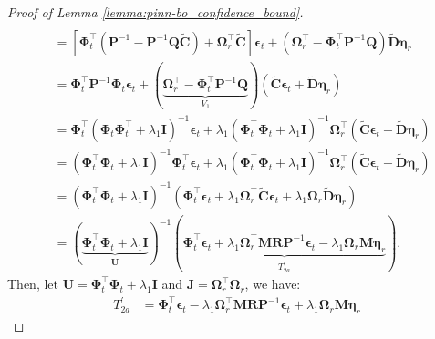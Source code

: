 \begin{proof}[Proof of Lemma \ref{lemma:pinn-bo_confidence_bound}]
\begin{align*}
\\
       & = \left[\boldsymbol{\Phi}_t^\top (\mathbf{P}^{-1} - \mathbf{P}^{-1}\mathbf{Q}\widetilde{\mathbf{C}}) +  \boldsymbol{\Omega}_r^\top \widetilde{\mathbf{C}}\right]\boldsymbol{\epsilon}_t + (\boldsymbol{\Omega}_r^\top - \boldsymbol{\Phi}_t^\top\mathbf{P}^{-1}\mathbf{Q})\widetilde{\mathbf{D}} \boldsymbol{\eta}_r 
\\ 
       & = \boldsymbol{\Phi}_t^\top \mathbf{P}^{-1} \boldsymbol{\Phi}_t \boldsymbol{\epsilon}_t + (\underbrace{\boldsymbol{\Omega}_r^\top - \boldsymbol{\Phi}_t^\top\mathbf{P}^{-1}\mathbf{Q}}_{V_1})(\widetilde{\mathbf{C}} \boldsymbol{\epsilon}_t + \widetilde{\mathbf{D}} \boldsymbol{\eta}_r) 
\\
       & = \boldsymbol{\Phi}_t^\top (\boldsymbol{\Phi}_t\boldsymbol{\Phi}_t^\top + \lambda_1\mathbf{I})^{-1} \boldsymbol{\epsilon}_t + \lambda_1(\boldsymbol{\Phi}_t^\top\boldsymbol{\Phi}_t + \lambda_1\mathbf{I})^{-1} \boldsymbol{\Omega}_r^\top (\widetilde{\mathbf{C}} \boldsymbol{\epsilon}_t + \widetilde{\mathbf{D}} \boldsymbol{\eta}_r) 
\\
       & = (\boldsymbol{\Phi}_t^\top\boldsymbol{\Phi}_t + \lambda_1\mathbf{I})^{-1} \boldsymbol{\Phi}_t^\top \boldsymbol{\epsilon}_t + \lambda_1(\boldsymbol{\Phi}_t^\top\boldsymbol{\Phi}_t + \lambda_1\mathbf{I})^{-1} \boldsymbol{\Omega}_r^\top (\widetilde{\mathbf{C}} \boldsymbol{\epsilon}_t + \widetilde{\mathbf{D}} \boldsymbol{\eta}_r) 
\\
       & = (\boldsymbol{\Phi}_t^\top\boldsymbol{\Phi}_t + \lambda_1\mathbf{I})^{-1} (\boldsymbol{\Phi}_t^\top \boldsymbol{\epsilon}_t + \lambda_1\boldsymbol{\Omega}_r^\top \widetilde{\mathbf{C}} \boldsymbol{\epsilon}_t +  \lambda_1\boldsymbol{\Omega}_r\widetilde{\mathbf{D}} \boldsymbol{\eta}_r) 
\\
       & = (\underbrace{\boldsymbol{\Phi}_t^\top\boldsymbol{\Phi}_t + \lambda_1\mathbf{I}}_\mathbf{U})^{-1} (\underbrace{\boldsymbol{\Phi}_t^\top \boldsymbol{\epsilon}_t + \lambda_1\boldsymbol{\Omega}_r^\top \mathbf{MR}\mathbf{P}^{-1} \boldsymbol{\epsilon}_t -  \lambda_1\boldsymbol{\Omega}_r \mathbf{M} \boldsymbol{\eta}_r}_{T_{2a}^\prime}).
   \end{align*}
   Then, let $\mathbf{U} = \boldsymbol{\Phi}_t^\top\boldsymbol{\Phi}_t + \lambda_1\mathbf{I}$ and $\mathbf{J} = \boldsymbol{\Omega}_r^\top \boldsymbol{\Omega}_r$, we have: 
   \begin{align*}
       T_{2a}^\prime &= \boldsymbol{\Phi}_t^\top \boldsymbol{\epsilon}_t -
       \lambda_1\boldsymbol{\Omega}_r^\top \mathbf{MR}\mathbf{P}^{-1} \boldsymbol{\epsilon}_t +  \lambda_1\boldsymbol{\Omega}_r \mathbf{M} \boldsymbol{\eta}_r 

\end{align*}
\end{proof}
